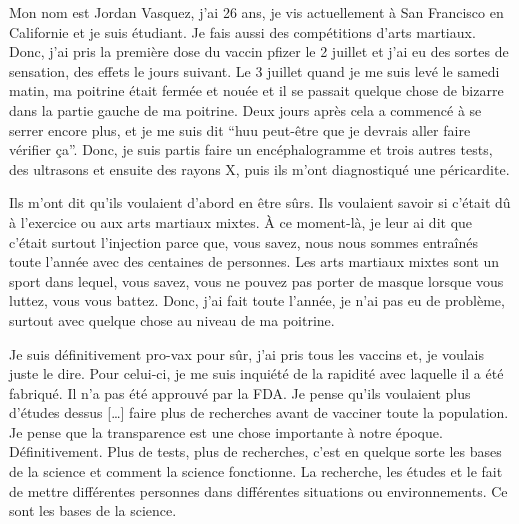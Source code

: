 Mon nom est Jordan Vasquez, j'ai 26 ans, je vis actuellement à San Francisco en
Californie et je suis étudiant. Je fais aussi des compétitions d'arts
martiaux. Donc, j'ai pris la première dose du vaccin pfizer le 2 juillet et j'ai
eu des sortes de sensation, des effets le jours suivant. Le 3 juillet quand je
me suis levé le samedi matin, ma poitrine était fermée et nouée et il se passait
quelque chose de bizarre dans la partie gauche de ma poitrine. Deux jours après
cela a commencé à se serrer encore plus, et je me suis dit “huu peut-être que je
devrais aller faire vérifier ça”. Donc, je suis partis faire un encéphalogramme
et trois autres tests, des ultrasons et ensuite des rayons X, puis ils m'ont
diagnostiqué une péricardite.

Ils m'ont dit qu'ils voulaient d'abord en être sûrs. Ils voulaient savoir si
c'était dû à l'exercice ou aux arts martiaux mixtes. À ce moment-là, je leur ai
dit que c'était surtout l'injection parce que, vous savez, nous nous sommes
entraînés toute l'année avec des centaines de personnes. Les arts martiaux
mixtes sont un sport dans lequel, vous savez, vous ne pouvez pas porter de
masque lorsque vous luttez, vous vous battez. Donc, j'ai fait toute l'année, je
n'ai pas eu de problème, surtout avec quelque chose au niveau de ma poitrine.

Je suis définitivement pro-vax pour sûr, j'ai pris tous les vaccins et, je
voulais juste le dire. Pour celui-ci, je me suis inquiété de la rapidité avec
laquelle il a été fabriqué. Il n'a pas été approuvé par la FDA. Je pense qu'ils
voulaient plus d'études dessus […] faire plus de recherches avant de vacciner
toute la population. Je pense que la transparence est une chose importante à
notre époque. Définitivement. Plus de tests, plus de recherches, c'est en
quelque sorte les bases de la science et comment la science fonctionne. La
recherche, les études et le fait de mettre différentes personnes dans
différentes situations ou environnements. Ce sont les bases de la science.

